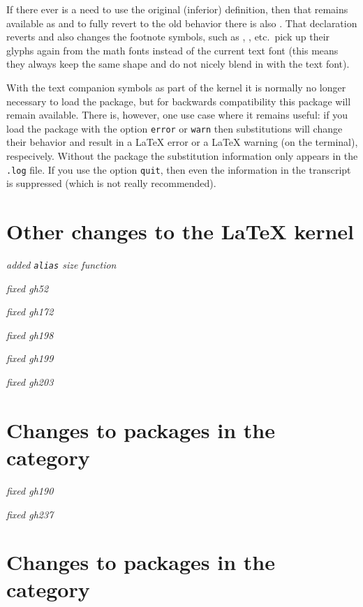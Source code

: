 \documentclass{ltnews}
\begin{document}
If there ever is a need to use the original (inferior) definition,
then that remains available as  and to fully
revert to the old behavior there is also
. That declaration reverts 
and also changes the footnote symbols, such as ,
, etc.\ pick up their glyphs again from the math
fonts instead of the current text font (this means they always keep
the same shape and do not nicely blend in with the text font).

With the text companion symbols as part of the kernel it is normally
no longer necessary to load the  package, but for
backwards compatibility this package will remain available.  There is,
however, one use case where it remains useful: if you load the package
with the option \texttt{error} or \texttt{warn} then substitutions
will change their behavior and result in a \LaTeX{} error or a
\LaTeX{} warning (on the terminal), respecively. Without the package
the substitution information only appears in the \texttt{.log}
file. If you use the option \texttt{quit}, then even the information in
the transcript is suppressed (which is not really recommended).

\section{Other changes to the \LaTeX{} kernel}

\emph{added \texttt{alias} size function}

\emph{fixed gh52}

\emph{fixed gh172}

\emph{fixed gh198}

\emph{fixed gh199}

\emph{fixed gh203}



\section{Changes to packages in the  category}

\emph{fixed gh190}

\emph{fixed gh237}



\section{Changes to packages in the  category}
\end{document}
